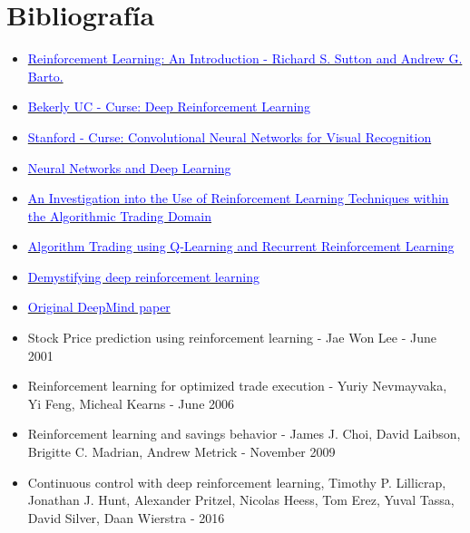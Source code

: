 \chapter{Bibliografía}


\begin{itemize}	
	\item \href{http://people.inf.elte.hu/lorincz/Files/RL_2006/SuttonBook.pdf}{\textcolor{blue}{Reinforcement Learning: An Introduction - Richard S. Sutton and Andrew G. Barto.}}
	\item \href{http://rll.berkeley.edu/deeprlcourse/}{\textcolor{blue}{Bekerly UC - Curse: Deep Reinforcement Learning}}
	\item \href{http://karpathy.github.io/2016/05/31/rl/}{\textcolor{blue}{Stanford - Curse: Convolutional Neural Networks for Visual Recognition}}
	\item \href{http://neuralnetworksanddeeplearning.com/}{\textcolor{blue}{Neural Networks and Deep Learning}}
	\item \href{http://www.doc.ic.ac.uk/teaching/distinguished-projects/2015/j.cumming.pdf}{\textcolor{blue}{An Investigation into the Use of Reinforcement Learning Techniques within the Algorithmic Trading Domain}}
	\item \href{http://cs229.stanford.edu/proj2009/LvDuZhai.pdf}{\textcolor{blue}{Algorithm Trading using Q-Learning and Recurrent Reinforcement Learning}}
	\item \href{http://neuro.cs.ut.ee/demystifying-deep-reinforcement-learning/}{\textcolor{blue}{Demystifying deep reinforcement learning}}
	\item \href{https://arxiv.org/pdf/1312.5602v1.pdf}{\textcolor{blue}{Original DeepMind paper}}
	\item Stock Price prediction using  reinforcement learning - Jae Won Lee - June 2001
	\item Reinforcement learning for optimized trade execution - Yuriy Nevmayvaka, Yi Feng, Micheal Kearns - June 2006
	\item Reinforcement learning and savings behavior - James J. Choi, David Laibson, Brigitte C. Madrian, Andrew Metrick - November 2009
	\item Continuous control with deep reinforcement learning, Timothy P. Lillicrap, Jonathan J. Hunt, Alexander Pritzel, Nicolas Heess, Tom Erez, Yuval Tassa, David Silver, Daan Wierstra - 2016
\end{itemize}